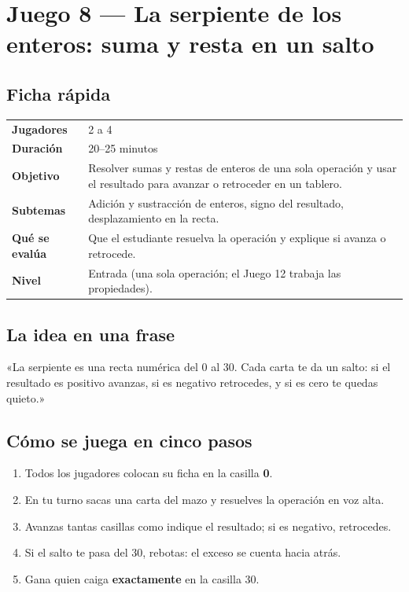 \documentclass[12pt, letterpaper]{article}
\begin{document}
\clearpage
\section{Juego 8 — La serpiente de los enteros: suma y resta en un salto}

\subsection{Ficha rápida}

\begin{center}
\small
\begin{tabular}{@{}p{3cm} p{12.2cm}@{}}
\toprule
\textbf{Jugadores} & 2 a 4\\
\textbf{Duración} & 20--25 minutos\\
\textbf{Objetivo} & Resolver sumas y restas de enteros de una sola operación y usar el resultado para avanzar o retroceder en un tablero.\\
\textbf{Subtemas} & Adición y sustracción de enteros, signo del resultado, desplazamiento en la recta.\\
\textbf{Qué se evalúa} & Que el estudiante resuelva la operación y explique si avanza o retrocede.\\
\textbf{Nivel} & Entrada (una sola operación; el Juego 12 trabaja las propiedades).\\
\bottomrule
\end{tabular}
\end{center}

\subsection{La idea en una frase}

\begin{cuadroextra}
  «La serpiente es una recta numérica del 0 al 30. Cada carta te da un salto: si el resultado es positivo avanzas, si es negativo retrocedes, y si es cero te quedas quieto.»
\end{cuadroextra}

\subsection{Cómo se juega en cinco pasos}

\begin{enumerate}[leftmargin=*]
  \item Todos los jugadores colocan su ficha en la casilla \textbf{0}.
  \item En tu turno sacas una carta del mazo y resuelves la operación en voz alta.
  \item Avanzas tantas casillas como indique el resultado; si es negativo, retrocedes.
  \item Si el salto te pasa del 30, rebotas: el exceso se cuenta hacia atrás.
  \item Gana quien caiga \textbf{exactamente} en la casilla 30.
\end{enumerate}
\end{document}
